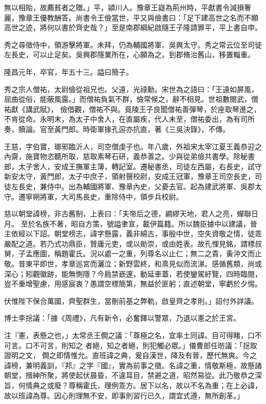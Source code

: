 \begin{pinyinscope}
 無以相貽，故薦貧者之贈。」平，潁川人。豫章王嶷為荊州時，平獻書令減損奢麗，豫章王優教酬答。尚書令王儉當世，平又與儉書曰：「足下建高世之名而不顯高世之迹，將何以書於齊史哉？」至是南郡綱紀啟隨王子隆請罪平，平上書自申。



 秀之尋徵侍中，領游擊將軍。未拜，仍為輔國將軍、吳興太守。秀之常云位至司徒左長史，可以止足矣。吳興郡隱業所在，心願為之。到郡脩治舊山，移置輜重。



 隆昌元年，卒官，年五十三。謚曰簡子。



 秀之宗人僧祐，太尉儉從祖兄也。父遠，光祿勳。宋世為之語曰：「王遠如屏風，屈曲從俗，能蔽風露。」而僧祐負氣不群，儉常候之，辭不相見。世祖數閱武，僧祐獻《講武賦》，
 儉借觀，僧祐不與。竟陵王子良聞僧祐善彈琴，於座取琴進之，不肯從命。永明末，為太子中舍人，在直屬疾，代人未至，僧祐委出，為有司所奏，贖論。官至黃門郎。時衛軍掾孔逭亦抗直，著《三吳決錄》，不傳。



 王慈，字伯寶，瑯邪臨沂人，司空僧虔子也。年八歲，外祖宋太宰江夏王義恭迎之內齋，施寶物恣聽所取，慈取素琴石研，義恭善之。少與從弟儉共書學。除秘書郎，太子舍人，安成王撫軍主簿，轉記室。遷秘書丞，司徒左西屬，右長史，試守新安太守，黃門郎，太子中庶子，領射聲校尉，安成王冠軍，豫章王司空長史，司徒左長史，兼侍中。出為輔國將軍、豫章內史，父憂去官。起為建武將軍、吳郡太守。遷寧朔將軍，大司馬長史，重除侍中，領步兵校尉。



 慈以朝堂諱榜，非古舊制，上表曰：「夫帝后之德，綢繆天地，君人之亮，蟬聯日月。
 至於名族不著，昭自方策，號謚聿宣，載伊篇籍。所以魏臣據中以建議，晉主依經以下詔。朝堂榜志，諱字懸露，義非綿古，事殷中世，空失資敬之情，徒乖嚴配之道。若乃式功鼎臣，贊庸元吏，或以勛崇，或由姓表。故孔悝見銘，謂標叔舅，子孟應圖，稱題霍氏。況以處一之重，列尊名以止仁；無二之貴，夤沖文而止敬。昔東平即世，孝章巡宮而灑泣；新野雲終，和熹見似而流涕。感循舊類，尚或深心；矧觀徽跡，能無惻隱？今扃禁嶔邃，動延車蓋，若使鑾駕紆覽，四時臨閱，豈不重增聖慮，用感宸衷？愚謂空標簡第，無益於匪躬；直述朝堂，寧虧於夕惕。



 伏惟陛下保合萬國，齊聖群生，當刪前基之弊軌，啟皇齊之孝則。」詔付外詳議。



 博士李捴議：「據《周禮》，凡有新令，必奮鐸以警眾，乃退以憲之於王宮。



 注『憲，表懸之也，」太常丞王僴之議：「尊極之名，宜率土同諱。目可得睹，口不可言。口不可言，則知之
 者絕，知之者絕，則犯觸必眾。」儀曹郎任昉議：「捴取證明之文，僴之即情惟允。直班諱之典，爰自漢世，降及有晉，歷代無爽。今之諱榜，兼明義訓，『邦』之字『國』，實為前事之徵。名諱之重，情敬斯極，故懸諸朝堂，搢紳所聚，將使起伏晨昏，不違耳目，禁避之道，昭然易從。此乃敬恭之深旨，何情典之或廢？尊稱霍氏，理例乖方。居下以名，故以不名為重；在上必諱，故以班諱為尊。因心則理無不安，即事則習行已久，謂宜式遵，無所創革。」




\end{pinyinscope}
